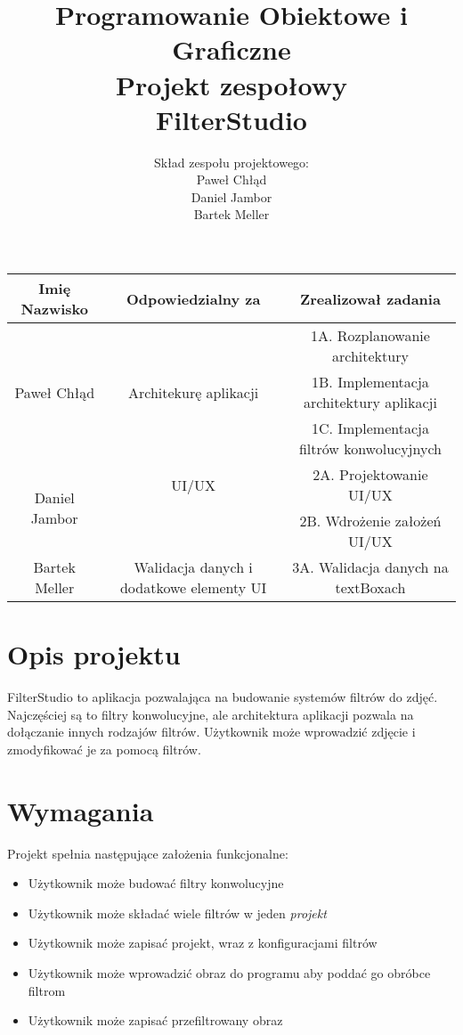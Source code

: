 \documentclass{article}
\title{Programowanie Obiektowe i Graficzne\\
Projekt zespołowy\\
\textbf{FilterStudio}}
\author{Skład zespołu projektowego: \\ Paweł Chłąd\\Daniel Jambor\\ Bartek Meller }
\begin{document}
\maketitle

\begin{center}
    \begin{tabular}{ |c|c|c| }
        \hline
        Imię Nazwisko                  & Odpowiedzialny za                        & Zrealizował zadania                      \\ \hline
        \multirow{3}{*}{Paweł Chłąd}   &                                          & 1A. Rozplanowanie architektury           \\
                                       & Architekurę aplikacji                    & 1B. Implementacja architektury aplikacji \\
                                       &                                          & 1C. Implementacja filtrów konwolucyjnych \\ \hline
        \multirow{2}{*}{Daniel Jambor} & UI/UX                                    & 2A. Projektowanie UI/UX                  \\
                                       &                                          & 2B. Wdrożenie założeń UI/UX              \\ \hline
        Bartek Meller                  & Walidacja danych i dodatkowe elementy UI & 3A. Walidacja danych na textBoxach       \\ \hline
    \end{tabular}
\end{center}

\pagebreak


\section{Opis projektu}
FilterStudio to aplikacja pozwalająca na budowanie systemów filtrów do zdjęć. Najczęściej są to filtry konwolucyjne, ale architektura aplikacji pozwala
na dołączanie innych rodzajów filtrów. Użytkownik może wprowadzić zdjęcie i zmodyfikować je za pomocą filtrów.
\section{Wymagania}
Projekt spełnia następujące założenia funkcjonalne:
\begin{itemize}
    \item Użytkownik może budować filtry konwolucyjne
    \item Użytkownik może składać wiele filtrów w jeden \textit{projekt}
    \item Użytkownik może zapisać projekt, wraz z konfiguracjami filtrów
    \item Użytkownik może wprowadzić obraz do programu aby poddać go obróbce filtrom
    \item Użytkownik może zapisać przefiltrowany obraz 
\end{itemize}
\end{document}
